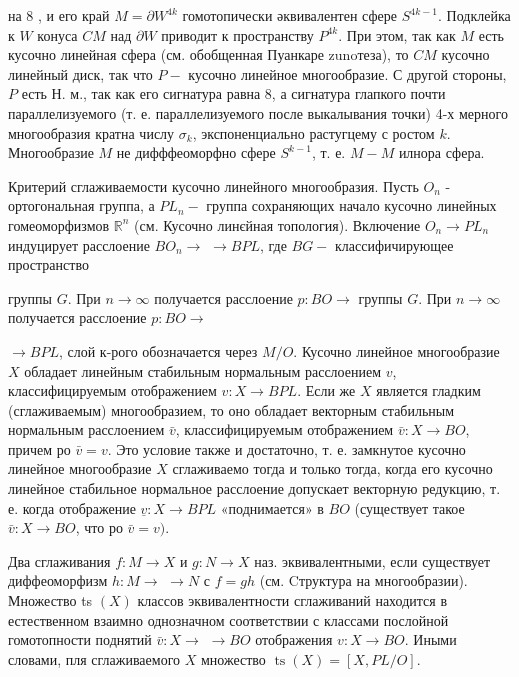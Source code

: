 \documentclass[10pt]{article}
\begin{document}
на 8 , и его край $M=\partial W^{4 k}$ гомотопически әквивалентен сфере $S^{4 k-1}$. Подклейка к $W$ конуса $C M$ над $\partial W$ приводит к пространству $P^{4 k}$. При этом, так как $M$ есть кусочно линейная сфера (см. обобщенная Пуанкаре zunoтеза), то $C M$ кусочно линейный диск, так что $P-$ кусочно линейное многообразие. С другой стороны, $P$ есть Н. м., так как его сигнатура равна 8, а сигнатура глапкого почти параллелизуемого (т. е. параллелизуемого после выкалывания точки) 4-х мерного многообразия кратна числу $\sigma_{k}$, экспоненциально растугцему с ростом $k$. Многообразие $M$ не дифффеоморфно сфере $S^{k-1}$, т. е. $M-M$ илнора сфера.



Критерий сглаживаемости кусочно линейного многообразия. Пусть $O_{n}$ - ортогональная группа, а $P L_{n}-$ группа сохраняющих начало кусочно линейных гомеоморфизмов $\mathbb{R}^{n}$ (см. Кусочно линєйная топология). Включение $O_{n} \rightarrow P L_{n}$ индуцирует расслоение $B O_{n} \rightarrow$ $\rightarrow B P L$, где $B G-$ классифичирующее пространство

группы $G$. При $n \rightarrow \infty$ получается расслоение $p: B O \rightarrow$ группы $G$. При $n \rightarrow \infty$ получается расслоение $p: B O \rightarrow$

$\rightarrow B P L$, слой к-рого обозначается через $M / O$. Кусочно линейное многообразие $X$ обладает линейным стабильным нормальным расслоением $v$, классифицируемым отображением $v: X \rightarrow B P L$. Если же $X$ является гладким (сглаживаемым) многообразием, то оно обладает векторным стабильным нормальным расслоением $\bar{v}$, классифицируемым отображением $\bar{v}: X \rightarrow B O$, причем ро $\bar{v}=v$. Это условие также и достаточно, т. е. замкнутое кусочно линейное многообразие $X$ сглаживаемо тогда и только тогда, когда его кусочно линейное стабильное нормальное расслоение допускает векторную редукцию, т. е. когда отображение $\underline{v}: X \rightarrow B P L$ «поднимается» в $B O$ (существует такое $\bar{v}: X \rightarrow B O$, что ро $\bar{v}=v)$.



Два сглаживания $f: M \rightarrow X$ и $g: N \rightarrow X$ наз. эквивалентными, если существует диффеоморфизм $h: M \rightarrow$ $\rightarrow N$ с $f=g h$ (см. Cтруктура на многообразии). Множество ts $(X)$ классов эквивалентности сглаживаний находится в естественном взаимно однозначном соответствии с классами послойной гомотопности поднятий $\bar{v}: X \rightarrow$ $\rightarrow B O$ отображения $v: X \rightarrow B O$. Иными словами, пля сглаживаемого $X$ множество $\operatorname{ts}(X)=[X, P L / O]$.
\end{document}
